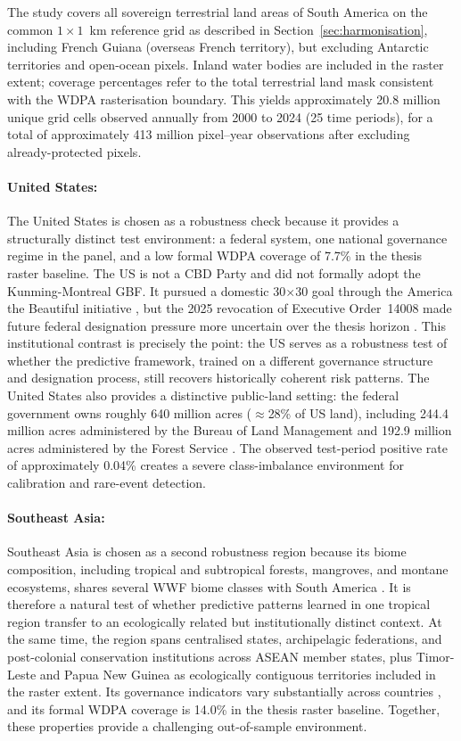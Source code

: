 \documentclass[12pt]{article}
\theoremstyle{break}
\begin{document}
The study covers all sovereign terrestrial land areas of South America on the common
$1 \times 1$~km reference grid as described in Section~\ref{sec:harmonisation}, including
French Guiana (overseas French territory),
but excluding Antarctic territories and open-ocean pixels. Inland water bodies are
included in the raster extent; coverage percentages refer to the total terrestrial
land mask consistent with the WDPA rasterisation boundary. This yields approximately 20.8 million unique grid cells observed annually
from 2000 to 2024 (25 time periods), for a total of approximately 413 million
pixel--year observations after excluding already-protected pixels.

\paragraph{United States:}
The United States is chosen as a robustness check because it provides a structurally
distinct test environment: a federal system, one national governance regime in the
panel, and a low formal WDPA coverage of 7.7\% in the thesis raster baseline.
The US is not a CBD Party and did not formally adopt the Kunming-Montreal GBF.
It pursued a domestic 30$\times$30 goal through the America the Beautiful initiative
\citep{doi2021america}, but the 2025 revocation of Executive Order~14008 made future
federal designation pressure more uncertain over the thesis horizon
\citep{whitehouse2025eo14154}.
This institutional contrast is precisely the point:
the US serves as a robustness test of whether the predictive framework, trained on
a different governance structure and designation process, still recovers
historically coherent risk patterns. The United States also provides a distinctive
public-land setting: the federal government owns roughly 640 million acres
(\(\approx\)28\% of US land), including 244.4 million acres administered by the
Bureau of Land Management and 192.9 million acres administered by the Forest
Service \citep{crs2020federallands}. The observed test-period positive rate of approximately 0.04\% creates a severe
class-imbalance environment for calibration and rare-event detection.

\paragraph{Southeast Asia:}
Southeast Asia is chosen as a second robustness region because its biome composition,
including tropical and subtropical forests, mangroves, and montane ecosystems, shares
several WWF biome classes with South America \citep{olson2001}. It is therefore a
natural test of whether predictive patterns learned in one tropical region transfer to
an ecologically related but institutionally distinct context. At the same time, the
region spans centralised states, archipelagic federations, and post-colonial
conservation institutions across ASEAN member states, plus Timor-Leste and Papua New
Guinea as ecologically contiguous territories included in the raster extent. Its
governance indicators vary substantially across countries \citep{wgi2025, vdem2025},
and its formal WDPA coverage is 14.0\% in the thesis raster baseline. Together, these
properties provide a challenging out-of-sample environment.
 
\end{document}

